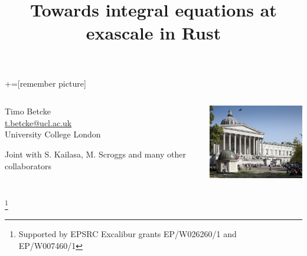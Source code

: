 \documentclass[dvipsnames,10pt]{beamer}
\title{Towards integral equations at exascale in Rust}
\date{}
\newcommand\blfootnote[1]{%
  \begingroup
  \renewcommand\thefootnote{}\footnote{#1}%
  \addtocounter{footnote}{-1}%
  \endgroup
}
\begin{document}
\lstset{language=Python}
+=[remember picture]
\begin{frame}

\vspace{1cm}

\titlepage
\vspace{-2cm}
\begin{columns}[T]
\begin{column}{.48\textwidth}
\begin{center}
    Timo Betcke \\
    \url{t.betcke@ucl.ac.uk}\\
    University College London
\end{center}
\begin{tcolorbox}
Joint with S. Kailasa, M. Scroggs and many
other collaborators
\end{tcolorbox}
\end{column}%
\hfill%
\begin{column}{.48\textwidth}
\includegraphics[width=5cm]{../figs/ucl_campus}

\end{column}%
\end{columns}

\blfootnote{\tiny Supported by EPSRC Excalibur grants EP/W026260/1 and EP/W007460/1}

\end{frame}
\end{document}
